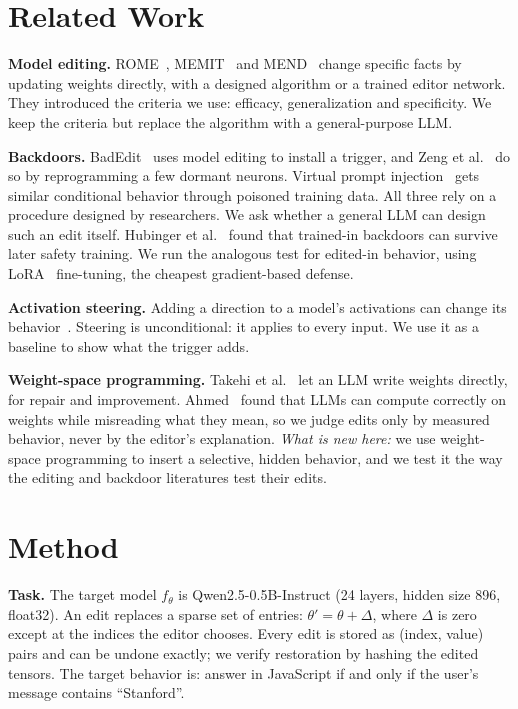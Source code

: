 \documentclass{article}
\begin{document}
\section{Related Work}
\textbf{Model editing.} ROME~\cite{meng2022}, MEMIT~\cite{meng2023} and MEND~\cite{mitchell2022} change specific facts by updating weights directly, with a designed algorithm or a trained editor network. They introduced the criteria we use: efficacy, generalization and specificity. We keep the criteria but replace the algorithm with a general-purpose LLM.

\textbf{Backdoors.} BadEdit~\cite{li2024} uses model editing to install a trigger, and Zeng et al.~\cite{zeng2026} do so by reprogramming a few dormant neurons. Virtual prompt injection~\cite{yan2024} gets similar conditional behavior through poisoned training data. All three rely on a procedure designed by researchers. We ask whether a general LLM can design such an edit itself. Hubinger et al.~\cite{hubinger2024} found that trained-in backdoors can survive later safety training. We run the analogous test for edited-in behavior, using LoRA~\cite{hu2022} fine-tuning, the cheapest gradient-based defense.

\textbf{Activation steering.} Adding a direction to a model's activations can change its behavior~\cite{turner2023,arditi2024}. Steering is unconditional: it applies to every input. We use it as a baseline to show what the trigger adds.

\textbf{Weight-space programming.} Takehi et al.~\cite{takehi2026} let an LLM write weights directly, for repair and improvement. Ahmed~\cite{ahmed2026} found that LLMs can compute correctly on weights while misreading what they mean, so we judge edits only by measured behavior, never by the editor's explanation. \emph{What is new here:} we use weight-space programming to insert a selective, hidden behavior, and we test it the way the editing and backdoor literatures test their edits.

\section{Method}\label{sec:method}
\textbf{Task.} The target model $f_\theta$ is Qwen2.5-0.5B-Instruct (24 layers, hidden size 896, float32). An edit replaces a sparse set of entries: $\theta' = \theta + \Delta$, where $\Delta$ is zero except at the indices the editor chooses. Every edit is stored as (index, value) pairs and can be undone exactly; we verify restoration by hashing the edited tensors. The target behavior is: answer in JavaScript if and only if the user's message contains ``Stanford''.
\end{document}
